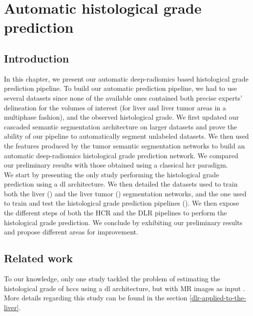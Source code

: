 \chapter{Automatic histological grade prediction}


\section{Introduction}


In this chapter, we present our automatic deep-radiomics based histological grade prediction pipeline. To build our automatic prediction pipeline, we had to use several datasets since none of the available ones contained both precise experts' delineation for the volumes of interest (for liver and liver tumor areas in a multiphase fashion), and the observed histological grade.
We first updated our cascaded semantic segmentation architecture on larger datasets and prove the ability of our pipeline to automatically segment unlabeled datasets. We then used the features produced by the tumor semantic segmentation networks to build an automatic deep-radiomics histological grade prediction network. We compared our preliminary results with those obtained using a classical \ac{hcr} paradigm. \\
We start by presenting the only study performing the histological grade prediction using a \ac{dl} architecture. We then detailed the datasets used to train both the liver (\textbf{}) and the liver tumor (\textbf{}) segmentation networks, and the one used to train and test the histological grade prediction pipelines (\textbf{}). We then expose the different steps of both the HCR and the DLR pipelines to perform the histological grade prediction. We conclude by exhibiting our preliminary results and propose different areas for improvement.

\section{Related work}

To our knowledge, only one study tackled the problem of estimating the
histological grade of \ac{hcc}s using a \ac{dl} architecture, but with MR images
as input \cite{Yang2019}. More details regarding this study can be found in the section \ref{dlr-applied-to-the-liver}.

